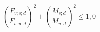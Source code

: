 \documentclass[12pt]{article}
\begin{document}
\begin{displaymath}
\left( \frac {F_{v;s;d}} {F_{v;u;d}} \right)^2 + \left( \frac {M_{s;d}} {M_{u;d}} \right)^2 \leq 1,0
\end{displaymath}
\end{document}
